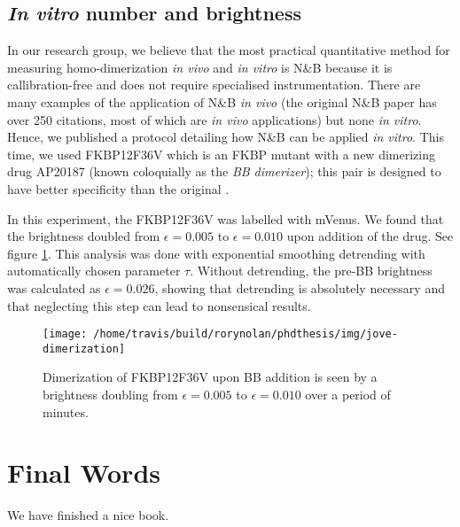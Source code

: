 \documentclass[12pt,]{book}
\theoremstyle{definition}
\theoremstyle{definition}
\theoremstyle{definition}
\theoremstyle{remark}
\begin{document}
\section{\texorpdfstring{\emph{In vitro} number and
brightness}{In vitro number and brightness}}\label{in-vitro-number-and-brightness}

In our research group, we believe that the most practical quantitative
method for measuring homo-dimerization \emph{in vivo} and \emph{in
vitro} is N\&B \citep{NB} because it is callibration-free and does not
require specialised instrumentation. There are many examples of the
application of N\&B \emph{in vivo} (the original N\&B paper has over 250
citations, most of which are \emph{in vivo} applications) but none
\emph{in vitro}. Hence, we published a protocol \citep{JOVE} detailing
how N\&B can be applied \emph{in vitro}. This time, we used FKBP12F36V
which is an FKBP mutant with a new dimerizing drug AP20187 (known
coloquially as the \emph{BB dimerizer}); this pair is designed to have
better specificity than the original \citep{Clackson}.

In this experiment, the FKBP12F36V was labelled with mVenus. We found
that the brightness doubled from \(\epsilon = 0.005\) to
\(\epsilon = 0.010\) upon addition of the drug. See figure
\ref{fig:jove}. This analysis was done with exponential smoothing
detrending with automatically chosen parameter \(\tau\). Without
detrending, the pre-BB brightness was calculated as
\(\epsilon = 0.026\), showing that detrending is absolutely necessary
and that neglecting this step can lead to nonsensical results.





\begin{figure}

\texttt{[image: /home/travis/build/rorynolan/phdthesis/img/jove-dimerization]} \hfill{}

\caption{Dimerization of FKBP12F36V upon BB addition is seen
by a brightness doubling from \(\epsilon = 0.005\) to
\(\epsilon = 0.010\) over a period of minutes.}\label{fig:jove}
\end{figure}

\chapter{Final Words}\label{final-words}

We have finished a nice book.


\end{document}
